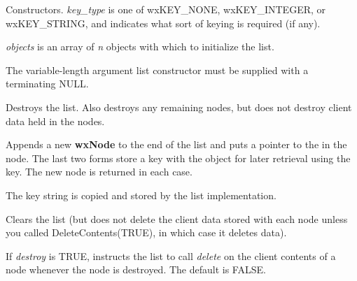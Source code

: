 {





Constructors. {\it key\_type} is one of wxKEY\_NONE, wxKEY\_INTEGER, or wxKEY\_STRING,
and indicates what sort of keying is required (if any).

{\it objects} is an array of {\it n} objects with which to initialize the list.

The variable-length argument list constructor must be supplied with a
terminating NULL.



Destroys the list.  Also destroys any remaining nodes, but does not destroy
client data held in the nodes.

\label{wxlistappend}




Appends a new {\bf wxNode} to the end of the list and puts a pointer to the
 in the node.  The last two forms store a key with the object for
later retrieval using the key. The new node is returned in each case.

The key string is copied and stored by the list implementation.

\label{wxlistclear}


Clears the list (but does not delete the client data stored with each node
unless you called DeleteContents(TRUE), in which case it deletes data).

\label{wxlistdeletecontents}


If {\it destroy} is TRUE, instructs the list to call {\it delete} on the client contents of
a node whenever the node is destroyed. The default is FALSE.

}
